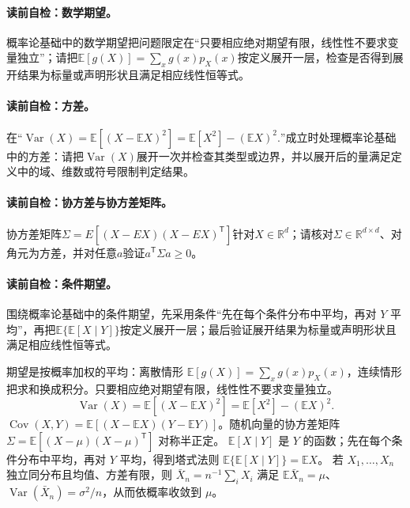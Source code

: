 \paragraph{读前自检：数学期望。}概率论基础中的数学期望把问题限定在“只要相应绝对期望有限，线性性不要求变量独立”；请把$\mathbb E[g(X)]=\sum_xg(x)p_X(x)$按定义展开一层，检查是否得到展开结果为标量或声明形状且满足相应线性恒等式。\par
\paragraph{读前自检：方差。}在“$\operatorname{Var}(X)=\mathbb E[(X-\mathbb EX)^2]=\mathbb E[X^2]-(\mathbb EX)^2.$”成立时处理概率论基础中的方差：请把$\operatorname{Var}(X)$展开一次并检查其类型或边界，并以展开后的量满足定义中的域、维数或符号限制判定结果。\par
\paragraph{读前自检：协方差与协方差矩阵。}协方差矩阵$\Sigma=E[(X-EX)(X-EX)^{\mathsf T}]$针对$X\in\mathbb R^d$；请核对$\Sigma\in\mathbb R^{d\times d}$、对角元为方差，并对任意$a$验证$a^{\mathsf T}\Sigma a\ge0$。\par
\paragraph{读前自检：条件期望。}围绕概率论基础中的条件期望，先采用条件“先在每个条件分布中平均，再对 $Y$ 平均”，再把$\mathbb E\{\mathbb E[X\mid Y]\}$按定义展开一层；最后验证展开结果为标量或声明形状且满足相应线性恒等式。\par

期望是按概率加权的平均：离散情形 $\mathbb E[g(X)]=\sum_xg(x)p_X(x)$，连续情形把求和换成积分。只要相应绝对期望有限，线性性不要求变量独立。
\[
\operatorname{Var}(X)=\mathbb E[(X-\mathbb EX)^2]=\mathbb E[X^2]-(\mathbb EX)^2.
\]
$\operatorname{Cov}(X,Y)=\mathbb E[(X-\mathbb EX)(Y-\mathbb EY)]$。随机向量的协方差矩阵 $\Sigma=\mathbb E[(X-\mu)(X-\mu)^{\mathsf T}]$ 对称半正定。
$\mathbb E[X\mid Y]$ 是 $Y$ 的函数；先在每个条件分布中平均，再对 $Y$ 平均，得到塔式法则 $\mathbb E\{\mathbb E[X\mid Y]\}=\mathbb EX$。
若 $X_1,\ldots,X_n$ 独立同分布且均值、方差有限，则 $\bar X_n=n^{-1}\sum_iX_i$ 满足 $\mathbb E\bar X_n=\mu$、$\operatorname{Var}(\bar X_n)=\sigma^2/n$，从而依概率收敛到 $\mu$。

